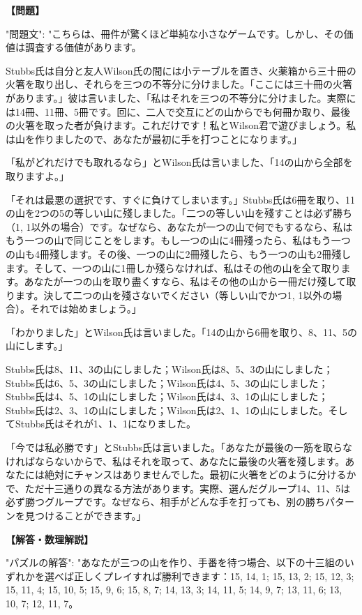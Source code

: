 \documentclass[10pt,a4paper,oneside,openany]{ltjsbook}
\begin{document}
\begin{tcolorbox}[colback=softblue,colframe=primaryblue,title=\textbf{第 396 問：A MATCH MYSTERY.},arc=2mm,boxrule=1pt,breakable]
\textbf{【問題】}\par\vspace{0.3em}
{
  "問題文": "こちらは、冊件が驚くほど単純な小さなゲームです。しかし、その価値は調査する価値があります。

Stubbs氏は自分と友人Wilson氏の間には小テーブルを置き、火薬箱から三十冊の火箸を取り出し、それらを三つの不等分に分けました。「ここには三十冊の火箸があります。」彼は言いました、「私はそれを三つの不等分に分けました。実際には14冊、11冊、5冊です。回に、二人で交互にどの山からでも何冊か取り、最後の火箸を取った者が負けます。これだけです！私とWilson君で遊びましょう。私は山を作りましたので、あなたが最初に手を打つことになります。」

「私がどれだけでも取れるなら」とWilson氏は言いました、「14の山から全部を取りますよ。」

「それは最悪の選択です、すぐに負けてしまいます。」Stubbs氏は6冊を取り、11の山を2つの5の等しい山に殘しました。「二つの等しい山を殘すことは必ず勝ち（1, 1以外の場合）です。なぜなら、あなたが一つの山で何でもするなら、私はもう一つの山で同じことをします。もし一つの山に4冊殘ったら、私はもう一つの山も4冊殘します。その後、一つの山に2冊殘したら、もう一つの山も2冊殘します。そして、一つの山に1冊しか殘らなければ、私はその他の山を全て取ります。あなたが一つの山を取り盡くすなら、私はその他の山から一冊だけ殘して取ります。決して二つの山を殘さないでください（等しい山でかつ1, 1以外の場合）。それでは始めましょう。」

「わかりました」とWilson氏は言いました。「14の山から6冊を取り、8、11、5の山にします。」

Stubbs氏は8、11、3の山にしました；Wilson氏は8、5、3の山にしました；Stubbs氏は6、5、3の山にしました；Wilson氏は4、5、3の山にしました；Stubbs氏は4、5、1の山にしました；Wilson氏は4、3、1の山にしました；Stubbs氏は2、3、1の山にしました；Wilson氏は2、1、1の山にしました。そしてStubbs氏はそれが1、1、1になりました。

「今では私必勝です」とStubbs氏は言いました。「あなたが最後の一筋を取らなければならないからで、私はそれを取って、あなたに最後の火箸を殘します。あなたには絶対にチャンスはありませんでした。最初に火箸をどのように分けるかで、ただ十三通りの異なる方法があります。実際、選んだグループ14、11、5は必ず勝つグループです。なぜなら、相手がどんな手を打っても、別の勝ちパターンを見つけることができます。」
}
\tcblower
\textbf{【解答・数理解説】}\par\vspace{0.3em}
{
  "パズルの解答": "あなたが三つの山を作り、手番を待つ場合、以下の十三組のいずれかを選べば正しくプレイすれば勝利できます：15, 14, 1; 15, 13, 2; 15, 12, 3; 15, 11, 4; 15, 10, 5; 15, 9, 6; 15, 8, 7; 14, 13, 3; 14, 11, 5; 14, 9, 7; 13, 11, 6; 13, 10, 7; 12, 11, 7。

}
\end{tcolorbox}
\end{document}
